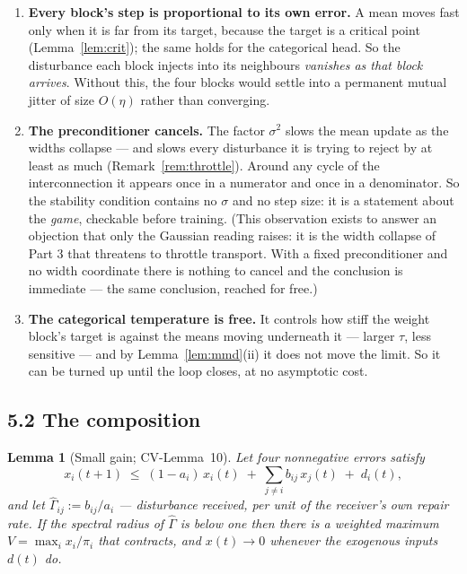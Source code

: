 \documentclass[11pt]{article}
\newtheorem{lemma}[theorem]{Lemma}
\theoremstyle{definition}
\newcommand{\CV}[1]{\textsf{CV-#1}}
\begin{document}
\begin{enumerate}[leftmargin=1.4em]
\item \textbf{Every block's step is proportional to its own error.} A mean moves
  fast only when it is far from its target, because the target is a critical point
  (Lemma~\ref{lem:crit}); the same holds for the categorical head. So the
  disturbance each block injects into its neighbours \emph{vanishes as that block
  arrives}. Without this, the four blocks would settle into a permanent mutual
  jitter of size $O(\eta)$ rather than converging.
\item \textbf{The preconditioner cancels.} The factor $\sigma^2$ slows the mean
  update as the widths collapse --- and slows every disturbance it is trying to
  reject by at least as much (Remark~\ref{rem:throttle}). Around any cycle of the
  interconnection it appears once in a numerator and once in a denominator. So
  the stability condition contains no $\sigma$ and no step size: it is a statement
  about the \emph{game}, checkable before training. (This observation exists to
  answer an objection that only the Gaussian reading raises: it is the width
  collapse of Part 3 that threatens to throttle transport. With a fixed
  preconditioner and no width coordinate there is nothing to cancel and the
  conclusion is immediate --- the same conclusion, reached for free.)
\item \textbf{The categorical temperature is free.} It controls how stiff the
  weight block's target is against the means moving underneath it --- larger
  $\tau$, less sensitive --- and by Lemma~\ref{lem:mmd}(ii) it does not move the
  limit. So it can be turned up until the loop closes, at no asymptotic cost.
\end{enumerate}

\subsection*{5.2 The composition}

\begin{lemma}[Small gain; \CV{Lemma~10}]\label{lem:sg}
Let four nonnegative errors satisfy
\[
  x_i(t+1) \;\le\; (1 - a_i)\,x_i(t) \;+\; \sum_{j\ne i} b_{ij}\,x_j(t)
  \;+\; d_i(t),
\]
and let $\hat\Gamma_{ij} := b_{ij}/a_i$ --- disturbance received, per unit of the
receiver's own repair rate. If the spectral radius of $\hat\Gamma$ is below one
then there is a weighted maximum $V = \max_i x_i/\pi_i$ that contracts, and
$x(t) \to 0$ whenever the exogenous inputs $d(t)$ do.
\end{lemma}
\end{document}
